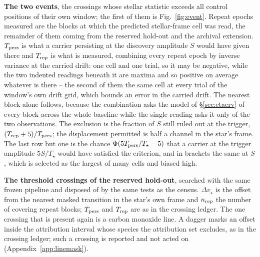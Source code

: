\begin{table}
\centering
\caption{\textbf{The two events}, the crossings whose
stellar statistic exceeds all \NCtrl{} control positions of their own window;
the first of them is Fig.~\ref{fig:event}.
Repeat epochs measured are the blocks at which the predicted stellar-frame
cell was read, the remainder of them coming from the reserved hold-out and the
archival extension.
$T_{\rm pers}$ is what a carrier persisting at the discovery amplitude $S$
would have given there and $T_{\rm rep}$ is what is measured, combining every
repeat epoch by inverse variance at the carried drift: one cell and one
trial, so it may be negative, while the two indented readings beneath it are
maxima and so positive on average whatever is there -- the second of them
the same cell at every trial of the window's own drift grid, which bounds an
error in the carried drift. The nearest block alone
follows, because the combination asks the model of \S\ref{sec:etacrv} of
every block across the whole baseline while the single reading asks it only
of the two observations. The exclusion is the fraction of $S$ still
ruled out at the trigger, $(T_{\rm rep}+5)/T_{\rm pers}$; the displacement
permitted is half a channel in the star's frame. The last row but one is the
chance $\Phi(5T_{\rm pers}/T_\star-5)$ that a carrier at the trigger
amplitude $5S/T_\star$ would have satisfied the criterion, and in brackets the
same at $S$, which is selected as the largest of many cells and biased high.}
\label{tab:cand}
\footnotesize

\end{table}

\begin{table}
\centering
\caption{\textbf{The threshold crossings of the reserved hold-out}, searched
with the same frozen pipeline and disposed of by the same tests as the
census. $\Delta v_\star$ is the offset from the nearest masked transition in
the star's own frame and $n_{\rm rep}$ the number of covering repeat blocks;
$T_{\rm pers}$ and $T_{\rm rep}$ are as in the crossing ledger. The one
crossing that is present again is a carbon monoxide line. A dagger marks an
offset inside the attribution interval whose species the attribution set
excludes, as in the crossing ledger; such a crossing is reported and not
acted on (Appendix~\ref{app:linemask}).}
\label{tab:holdout}
\scriptsize

\end{table}




